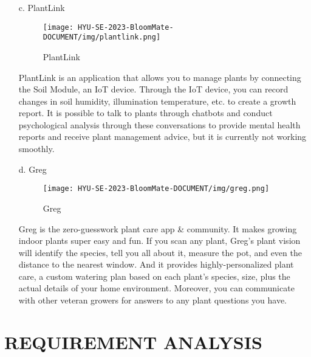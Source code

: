 \documentclass[conference, a4paper]{IEEEtran}
\begin{document}
\begin{enumerate}
\item[c.]PlantLink

\begin{figure}[h]
\texttt{[image: HYU-SE-2023-BloomMate-DOCUMENT/img/plantlink.png]}
\label{fig:PlantLinkIoT}
\caption{PlantLink} 
\end{figure}

\item[]PlantLink is an application that allows you to manage plants by connecting the Soil Module, an IoT device. Through the IoT device, you can record changes in soil humidity, illumination temperature, etc. to create a growth report. It is possible to talk to plants through chatbots and conduct psychological analysis through these conversations to provide mental health reports and receive plant management advice, but it is currently not working smoothly. \\

\newpage

\item[d.]Greg

\begin{figure}[h]
\texttt{[image: HYU-SE-2023-BloomMate-DOCUMENT/img/greg.png]}
\label{fig:Greg}
\caption{Greg} 
\end{figure}

\item[]Greg is the zero-guesswork plant care app \& community. It makes growing indoor plants super easy and fun. If you scan any plant, Greg’s plant vision will identify the species, tell you all about it, measure the pot, and even the distance to the nearest window. And it provides highly-personalized plant care, a custom watering plan based on each plant’s species, size, plus the actual details of your home environment. Moreover, you can communicate with other veteran growers for answers to any plant questions you have. \\
\end{enumerate}

\section{REQUIREMENT ANALYSIS}
\end{document}
